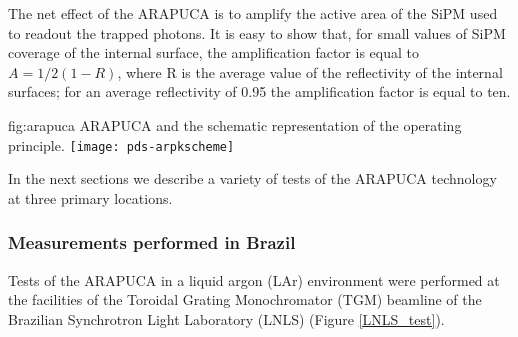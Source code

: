
The net effect of the ARAPUCA is to amplify the active area of the SiPM used to readout the trapped photons. It is easy to show that, for small values of SiPM coverage of the internal surface, the amplification factor is equal to $A=1/2(1-R)$,
where R is the average value of the reflectivity of the internal surfaces; for an average reflectivity of 0.95 the amplification factor is equal to ten.

\begin{dunefigure}{fig:arapuca}
{ARAPUCA and the schematic representation of the operating principle.}
  \texttt{[image: pds-arpkscheme]}   
\end{dunefigure}

In the next sections we describe a variety of tests of the ARAPUCA technology at three primary locations.

\subsubsection{Measurements performed in Brazil}
\label{subsec:testlnls}

Tests of the ARAPUCA in a liquid argon (LAr) environment were performed at the facilities of the Toroidal Grating Monochromator (TGM) beamline of the Brazilian Synchrotron Light Laboratory (LNLS) (Figure \ref{LNLS_test}). 


